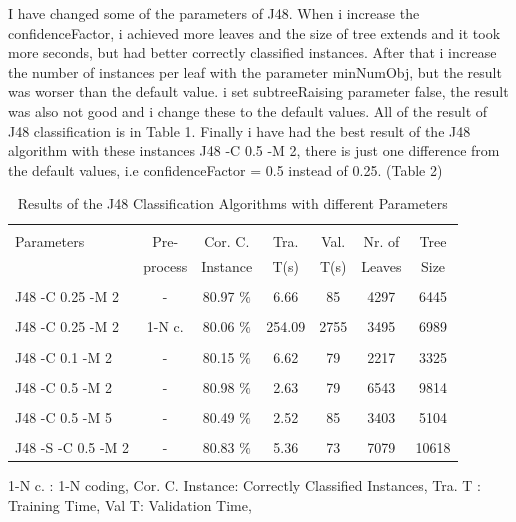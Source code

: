 \documentclass[a4paper]{article}
\begin{document}
I have changed some of the parameters of J48. When i increase the confidenceFactor, i achieved more leaves and the size of tree extends and it took more seconds, but had better correctly classified instances. After that i increase the number of instances per leaf with the parameter minNumObj, but the result was worser than the default value. i set subtreeRaising parameter false, the result was also not good and i change these to the default values. All of the result of J48 classification is in Table 1. Finally i have had the best result of the J48 algorithm with these instances J48 -C 0.5 -M 2, there is just one difference from the default values, i.e confidenceFactor = 0.5 instead of 0.25. (Table 2) 

\begin{table}
\begin{tabular}{|l| c | c | c | c |c |c |}

\hline & & & & & & \\
Parameters & Pre- & Cor. C.& Tra. & Val. & Nr. of  &  Tree  \\
 & process  & Instance & T(s) &  T(s) & Leaves & Size \\
\hline & & & & & & \\
J48 -C 0.25 -M 2 	 & - &			80.97  $\%$ & 6.66 & 85 & 4297  & 6445 \\ 
\hline & & & & & & \\
J48 -C 0.25 -M 2 	& 1-N c. &	80.06 $\%$ & 254.09 & 2755 & 3495  & 6989  \\ 
\hline & & & & & & \\
J48 -C 0.1 -M 2 	 & - &			80.15  $\%$ & 6.62 & 79 &  2217 & 3325\\ 
\hline & & & & & & \\
J48 -C 0.5 -M 2 	& - &			80.98 $\%$ & 2.63 & 79 &  6543 & 9814 \\ 
\hline & & & & & & \\
J48 -C 0.5 -M 5  	 & - &			80.49 $\%$ & 2.52 & 85 &  3403 & 5104 \\ 
\hline & & & & & & \\
J48 -S -C 0.5 -M 2 	& -&			 80.83 $\%$ & 5.36 &  73 & 7079 & 10618\\ 
\hline
\end{tabular}
\caption{Results of the J48 Classification Algorithms with different Parameters}
	1-N c. : 1-N coding,
	Cor. C. Instance:  Correctly Classified Instances,
	Tra. T : Training Time,
	Val T: Validation Time,
\end{table}
\end{document}

